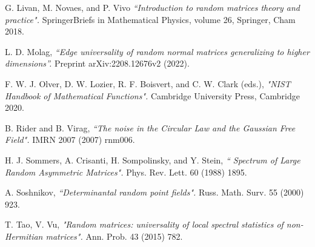 \documentclass[%
 jmp,
cp,  %
 amsmath,amsthm,amssymb,%
 reprint,%
onecolumn]{revtex4-2}
\begin{document}
\begin{thebibliography}{1}
G. Livan, M. Novaes, and P. Vivo \emph{``Introduction to random matrices theory and practice".}  SpringerBriefs in Mathematical Physics, volume 26, Springer, Cham 2018.

L. D. Molag,
\emph{``Edge universality of random normal matrices generalizing to higher dimensions''.}
Preprint 
     	arXiv:2208.12676v2 (2022).

F. W. J. Olver, D. W. Lozier, R. F. Boisvert, and C. W. Clark (eds.), 
\emph{"NIST Handbook of Mathematical Functions".} 
Cambridge University Press, Cambridge 2020.


 B. Rider and B. Virag, 
\emph{``The noise in the Circular Law and the Gaussian Free Field".}  
IMRN 2007 (2007) rnm006.

H. J. Sommers, A. Crisanti, H. Sompolinsky, and Y. Stein, \emph{`` Spectrum of Large Random Asymmetric Matrices".} Phys. Rev. Lett. 60 (1988) 1895.



 A. Soshnikov, \emph{``Determinantal random point fields".}   
Russ. Math. Surv. 55 %
(2000) 923.


  T. Tao, V. Vu, \emph{"Random matrices: universality of local spectral statistics of non-Hermitian matrices".}
Ann. Prob. 43 %
(2015) 782.%



\end{thebibliography}

\end{document}
